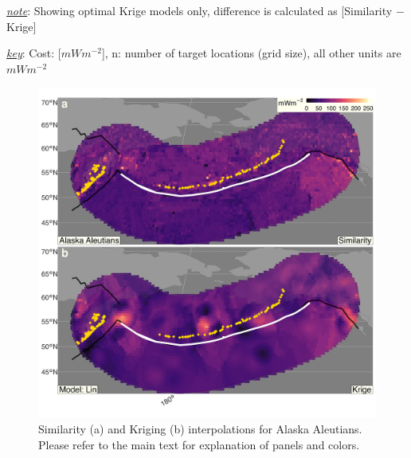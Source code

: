 \begin{table}
{\begin{threeparttable}
\begin{tabular}[t]{llrrrrrr}
\bottomrule
\end{tabular}
\begin{tablenotes}
\item \uline{\textit{note}}: Showing optimal Krige models only, difference is calculated as [Similarity $-$ Krige]
\item \uline{\textit{key}}: Cost: [$mWm^{-2}$], n: number of target locations (grid size), all other units are $mWm^{-2}$
\end{tablenotes}
\end{threeparttable}}
\end{table}

\begin{figure}[htbp]

{\centering \includegraphics[width=1\linewidth,]{assets/figs/chpt3/AlaskaAleutiansDiffComp} 

}

\caption[Similarityand Kriging interpolations for Alaska Aleutians]{Similarity (a) and Kriging (b) interpolations for Alaska Aleutians. Please refer to the main text for explanation of panels and colors.}\label{fig:alaskaAleutiansDiff}
\end{figure}

